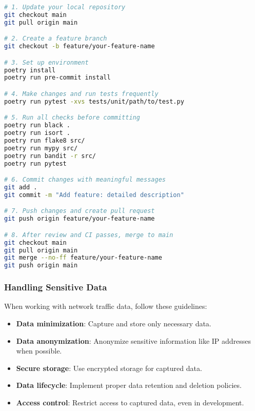 \begin{lstlisting}[language=bash, caption=Complete Development Workflow]
# 1. Update your local repository
git checkout main
git pull origin main

# 2. Create a feature branch
git checkout -b feature/your-feature-name

# 3. Set up environment
poetry install
poetry run pre-commit install

# 4. Make changes and run tests frequently
poetry run pytest -xvs tests/unit/path/to/test.py

# 5. Run all checks before committing
poetry run black .
poetry run isort .
poetry run flake8 src/
poetry run mypy src/
poetry run bandit -r src/
poetry run pytest

# 6. Commit changes with meaningful messages
git add .
git commit -m "Add feature: detailed description"

# 7. Push changes and create pull request
git push origin feature/your-feature-name

# 8. After review and CI passes, merge to main
git checkout main
git pull origin main
git merge --no-ff feature/your-feature-name
git push origin main
\end{lstlisting}

\subsubsection{Handling Sensitive Data}
When working with network traffic data, follow these guidelines:

\begin{itemize}
    \item \textbf{Data minimization}: Capture and store only necessary data.
    \item \textbf{Data anonymization}: Anonymize sensitive information like IP addresses when possible.
    \item \textbf{Secure storage}: Use encrypted storage for captured data.
    \item \textbf{Data lifecycle}: Implement proper data retention and deletion policies.
    \item \textbf{Access control}: Restrict access to captured data, even in development.
\end{itemize}

